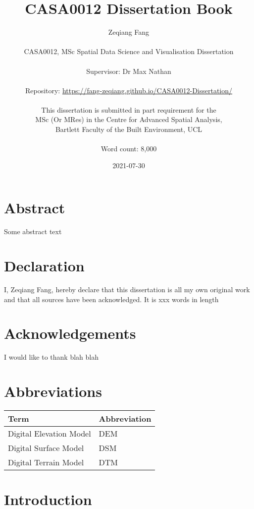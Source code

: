 \documentclass[
  12pt,
  oneside]{book}
\title{CASA0012 Dissertation Book}
\author{Zeqiang Fang\\
~\\
CASA0012, MSc Spatial Data Science and Visualisation Dissertation\\
~\\
Supervisor: Dr Max Nathan\\
~\\
Repository: \url{https://fang-zeqiang.github.io/CASA0012-Dissertation/}\\
~\\
This dissertation is submitted in part requirement for the\\
MSc (Or MRes) in the Centre for Advanced Spatial Analysis,\\
Bartlett Faculty of the Built Environment, UCL\\
~\\
Word count: 8,000}
\date{2021-07-30}
\begin{document}
\maketitle


\hypertarget{abstract}{%
\chapter*{Abstract}\label{abstract}}

Some abstract text


\hypertarget{declaration}{%
\chapter*{Declaration}\label{declaration}}

I, Zeqiang Fang, hereby declare that this dissertation is all my own original work and that all sources have been acknowledged. It is xxx words in length

\hypertarget{acknowledgements}{%
\chapter*{Acknowledgements}\label{acknowledgements}}

I would like to thank blah blah

\setcounter{tocdepth}{3}
\tableofcontents
\listoffigures
\listoftables

\hypertarget{abbreviations}{%
\chapter*{Abbreviations}\label{abbreviations}}

\begin{table}
\centering
\begin{tabular}{ll}
\toprule
\textbf{Term} & \textbf{Abbreviation}\\
\midrule
Digital Elevation Model & DEM\\
Digital Surface Model & DSM\\
Digital Terrain Model & DTM\\
\bottomrule
\end{tabular}
\end{table}

\hypertarget{introduction}{%
\chapter{Introduction}\label{introduction}}
\end{document}
